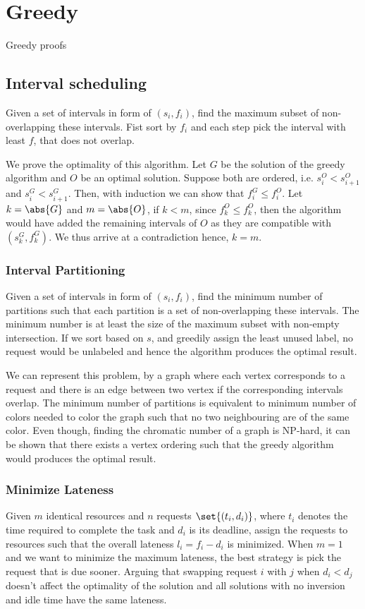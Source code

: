 \chapter{Greedy}
Greedy proofs
\section*{Interval scheduling}
Given a set of intervals in form of \((s_i,f_i)\), find the maximum subset of non-overlapping these intervals. Fist sort by \(f_i\) and each step pick the interval with least \(f\), that does not overlap. 

We prove the optimality of this algorithm. Let \(G\) be the solution of the greedy algorithm and \(O\) be an optimal solution. Suppose both are ordered, i.e. \(s_i^O < s_{i+1}^O\) and \(s_i^G < s_{i+1}^G\). Then, with induction we can show that \(f_i^G \leq f_i^O\). Let \(k = \abs{G}\) and \(m = \abs{O}\), if \(k < m\), since \(f_k^O \leq f_k^O\), then the algorithm would have added the remaining intervals of \(O\) as they are compatible with \((s_k^G, f_k^G)\). We thus arrive at a contradiction hence, \(k = m\).
\subsection*{Interval Partitioning}
Given a set of intervals in form of \((s_i,f_i)\), find the minimum number of partitions such that each partition is a set of non-overlapping these intervals. The minimum number is at least the size of the maximum subset with non-empty intersection. If we sort based on \(s\), and greedily assign the least unused label, no request would be unlabeled and hence the algorithm produces the optimal result.

We can represent this problem, by a graph where each vertex corresponds to a request and there is an edge between two vertex if the corresponding intervals overlap. The minimum number of partitions is equivalent to minimum number of colors needed to color the graph such that no two neighbouring are of the same color. Even though, finding the chromatic number of a graph is NP-hard, it can be shown that there exists a vertex ordering such that the greedy algorithm would produces the optimal result.
\subsection*{Minimize Lateness}
Given \(m\) identical resources and \(n\) requests \(\set{(t_i,d_i)}\), where \(t_i\) denotes the time required to complete the task and \(d_i\) is its deadline, assign the requests to resources such that the overall lateness \(l_i = f_i - d_i\) is minimized. When \(m = 1\) and we want to minimize the maximum lateness, the best strategy is pick the request that is due sooner. Arguing that swapping request \(i\) with \(j\) when \(d_i < d_j\) doesn't affect the optimality of the solution and all solutions with no inversion and idle time have the same lateness.
